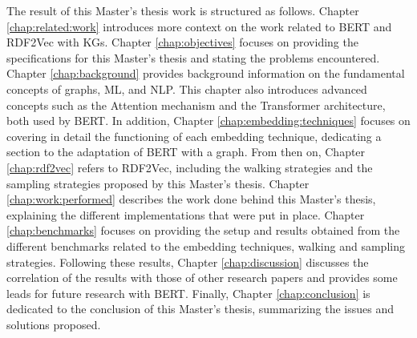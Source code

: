 The result of this Master's thesis work is structured as follows. Chapter
\ref{chap:related:work} introduces more context on the work related to BERT and
RDF2Vec with KGs. Chapter \ref{chap:objectives} focuses on providing the
specifications for this Master's thesis and stating the problems
encountered. Chapter \ref{chap:background} provides background information on
the fundamental concepts of graphs, ML, and NLP. This chapter also introduces
advanced concepts such as the Attention mechanism and the Transformer
architecture, both used by BERT. In addition, Chapter
\ref{chap:embedding:techniques} focuses on covering in detail the functioning of
each embedding technique, dedicating a section to the adaptation of BERT with a
graph. From then on, Chapter \ref{chap:rdf2vec} refers to RDF2Vec, including the
walking strategies and the sampling strategies proposed by this Master's
thesis. Chapter \ref{chap:work:performed} describes the work done behind this
Master's thesis, explaining the different implementations that were put in
place. Chapter \ref{chap:benchmarks} focuses on providing the setup and results
obtained from the different benchmarks related to the embedding techniques,
walking and sampling strategies. Following these results, Chapter
\ref{chap:discussion} discusses the correlation of the results with those of
other research papers and provides some leads for future research with
BERT. Finally, Chapter \ref{chap:conclusion} is dedicated to the conclusion of
this Master's thesis, summarizing the issues and solutions proposed.

